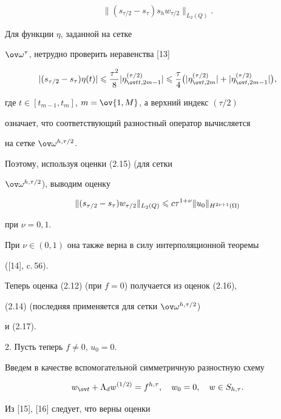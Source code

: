 \begin{pf}
\begin{equation}
\|(s_{\tau/2}-s_\tau)s_hw_{\tau/2}\|_{L_2(Q)}.


\end{equation}


Для функции $\eta$, заданной на сетке


$\ov \omega^{\tau}$, нетрудно проверить неравенства [13]


$$


|(s_{\tau/2}-s_\tau)\eta(t)|\lee \dfrac{\tau^2}{8}


|\eta^{(\tau/2)}_{\ov tt,2m-1}|\lee\dfrac{\tau}{4}\big(


|\eta^{(\tau/2)}_{\ov t,2m}|+|\eta^{(\tau/2)}_{\ov t,2m-1}|\big),


$$


где $t\in [t_{m-1},t_m]$, $m=\ov{1,M}$, а верхний индекс $(\tau/2)$


означает, что соответствующий разностный оператор вычисляется 


на сетке $\ov \omega^{h,\tau/2}$.


Поэтому, используя оценки (2.15) (для сетки


$\ov \omega^{h,\tau/2}$), выводим оценку


\begin{equation}


\|(s_{\tau/2}-s_\tau)w_{\tau/2}\|_{L_2(Q)}\lee c\tau^{1+\nu}


\|u_0\|_{H^{2\nu+1}(\Omega)}


\end{equation}


при $\nu=0,1$.


При $\nu\in (0,1)$ она также верна в силу интерполяционной теоремы


([14], c.\,56).


Теперь оценка (2.12) (при $f=0$) получается из оценок (2.16), 


(2.14) (последняя применяется для сетки $\ov \omega^{h,\tau/2}$)


и (2.17).





2. Пусть теперь $f\ne 0$, $u_0=0$. 


Введем в качестве вспомогательной симметричную разностную схему


$$


w_{\ov t}+\Lambda_d w^{(1/2)}=f^{h,\tau},\quad w_0=0,\quad w\in S_{h,\tau}.


$$


Из [15], [16] следует, что верны оценки



\end{pf}
